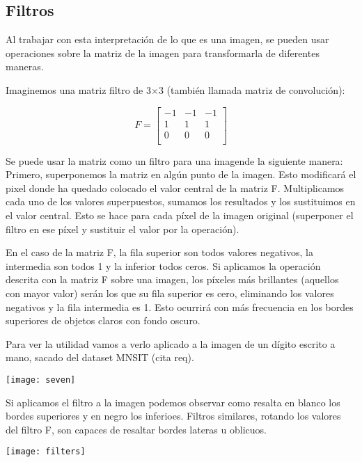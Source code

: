 \subsection{Filtros}

Al trabajar con esta interpretación de lo que es una imagen, se pueden usar operaciones sobre la matriz de la imagen para transformarla de diferentes maneras.

Imaginemos una matriz filtro de 3$\times$3 (también llamada matriz de convolución):

\[
  F=
  \left[ {\begin{array}{ccc}
   -1 & -1 & -1 \\
   1 & 1 & 1 \\
   0 & 0 & 0 \\
  \end{array} } \right]
\]

Se puede usar la matriz como un filtro para una imagende la siguiente manera: Primero, superponemos la matriz en algún punto de la imagen. Esto modificará el pixel donde ha quedado colocado el valor central de la matriz F. Multiplicamos cada uno de los valores superpuestos, sumamos los resultados y los sustituimos en el valor central. Esto se hace para cada píxel de la imagen original (superponer el filtro en ese píxel y sustituir el valor por la operación).

En el caso de la matriz F, la fila superior son todos valores negativos, la intermedia son todos 1 y la inferior todos ceros. Si aplicamos la operación descrita con la matriz F sobre una imagen, los píxeles más brillantes (aquellos con mayor valor) serán los que su fila superior es cero, eliminando los valores negativos y la fila intermedia es 1. Esto ocurrirá con más frecuencia en los bordes superiores de objetos claros con fondo oscuro.

Para ver la utilidad vamos a verlo aplicado a la imagen de un dígito escrito a mano, sacado del dataset MNSIT (cita req).
\begin{center}
  \texttt{[image: seven]}
\end{center}

Si aplicamos el filtro a la imagen podemos observar como resalta en blanco los bordes superiores y en negro los inferioes. Filtros similares, rotando los valores del filtro F, son capaces de resaltar bordes lateras u oblicuos.

\begin{center}
  \texttt{[image: filters]}
\end{center}

